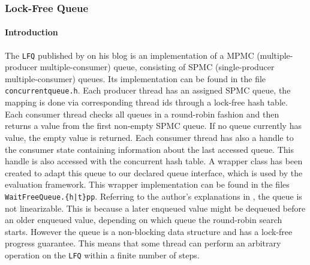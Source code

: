 \documentclass{article}
\newcommand{\LFQ}{\texttt{LFQ}}
\begin{document}
\subsubsection{Lock-Free Queue\label{sec:eval-benchmark-lfq}}
\paragraph{Introduction}
The \LFQ{} published by \citeauthor{LFQ} on his blog \cite{LFQ} is an implementation of a MPMC (multiple-producer multiple-consumer) queue, consisting of SPMC (single-producer multiple-consumer) queues. Its implementation can be found in the file \texttt{concurrentqueue.h}. Each producer thread has an assigned SPMC queue, the mapping is done via corresponding thread ids through a lock-free hash table. Each consumer thread checks all queues in a round-robin fashion and then returns a value from the first non-empty SPMC queue. If no queue currently has value, the empty value is returned. Each consumer thread has also a handle to the consumer state containing information about the last accessed queue. This handle is also accessed with the concurrent hash table. A wrapper class has been created to adapt this queue to our declared queue interface, which is used by the evaluation framework. This wrapper implementation can be found in the files \texttt{WaitFreeQueue.\{h|t\}pp}. Referring to the author's explanations in \cite{LFQEXPL}, the queue is not linearizable. This is because a later enqueued value might be dequeued before an older enqueued value, depending on which queue the round-robin search starts. However the queue is a non-blocking data structure and has a lock-free progress guarantee. This means that some thread can perform an arbitrary operation on the \LFQ{} within a finite number of steps.
\end{document}
